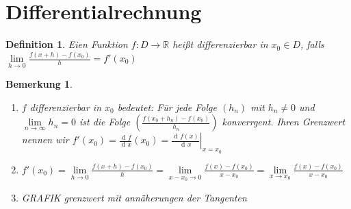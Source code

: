 \documentclass[a4paper,titlepage,oneside]{article}
\def\R{\ensuremath{\mathbb{R}} }
\newcommand{\der}{\operatorname{d\!}{}}
\renewcommand{\liminf}[2][n]{\ensuremath{\lim\limits_{#1 \rightarrow \infty}{#2}}}
\newcommand{\limnull}[2][n]{\ensuremath{\lim\limits_{#1 \rightarrow 0}{#2}}}
\newcommand{\limAB}[3][x]{\ensuremath{\lim\limits_{#1 \rightarrow #2}{#3}}}
\newcommand{\limA}[2][x_0]{\limAB{#1}{#2}}
\theoremstyle{thmstyle}
\newtheorem{defi}[satz]{Definition}
\newtheorem{bem}[satz]{Bemerkung}
\theoremstyle{subthmstyle}
\begin{document}
\newpage
\section{Differentialrechnung}

\begin{defi}
Eien Funktion $f : D \to \R$ heißt differenzierbar in $x_0 \in D$, falls $\limnull[h]{\frac{f(x + h) - f(x_0)}{h}} = f'(x_0)$
\end{defi}

\begin{bem}
\begin{enumerate}
\item $f$ differenzierbar in $x_0$ bedeutet:  Für jede Folge $(h_n)$ mit $h_n \ne 0$ und $\liminf{h_n} = 0$ ist die Folge $\left(\frac{f(x_0 + h_n) - f(x_0)}{h_n}\right)$ konverrgent. Ihren Grenzwert nennen wir $f'(x_0) = \frac{\der f}{\der x}(x_0) = \left.\frac{\der f(x)}{\der x}\right|_{x = x_0}$
\item $f'(x_0) = \limnull[h]{\frac{f(x + h) - f(x_0)}{h}} = \limnull[x-x_0]{\frac{f(x) - f(x_0)}{x-x_0}} = \limA{\frac{f(x) - f(x_0)}{x-x_0}}$
\item GRAFIK grenzwert mit annäherungen der Tangenten
\end{enumerate}
\end{bem}
\end{document}
